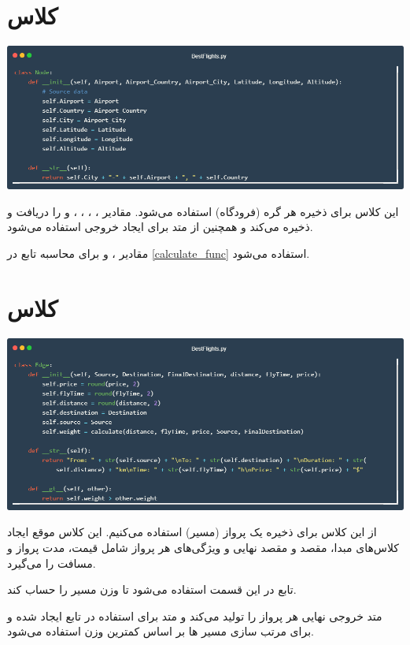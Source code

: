 \documentclass[12pt, dvipsnames, svgnames, x11names,]{article}
\begin{document}
	
	\section{کلاس } \label{node_class}
	
		{\includegraphics[width=14cm]{images/code04}} \par
		{\normalsize 
			این کلاس برای ذخیره هر گره (فرودگاه) استفاده می‌شود. مقادیر
			 ،‌ ، ، ،  و 
			  را دریافت و ذخیره می‌کند و همچنین از متد  برای ایجاد خروجی استفاده می‌شود.
			  
			  مقادیر ،  و  برای محاسبه تابع  در \ref{calculate_func} استفاده می‌شود. 
			}
		
		
	\section{کلاس } \label{edge_class}
		
		{\includegraphics[width=14cm]{images/code05}} \par
		{\normalsize 
		از این کلاس برای ذخیره یک پرواز (مسیر) استفاده می‌کنیم. این کلاس موقع ایجاد کلاس‌های مبدا، مقصد و مقصد نهایی و ویژگی‌های هر پرواز شامل قیمت، مدت پرواز و مسافت را می‌گیرد.
			
		تابع  در این قسمت استفاده می‌شود تا وزن مسیر را حساب کند.
		
		متد  خروجی نهایی هر پرواز را تولید می‌کند و متد  برای استفاده در تابع  ایجاد شده و برای مرتب سازی مسیر ها بر اساس کمترین وزن استفاده می‌شود.
		}
	
\end{document}
